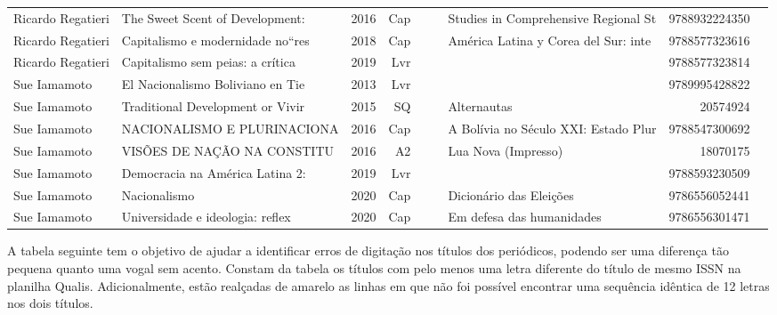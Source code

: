 \documentclass[12pt,brazil]{article}\usepackage[]{graphicx}\usepackage[]{xcolor}
\newcounter{tabela}
\begin{document}
\begin{longtable}{lllrrllrr}
Ricardo Regatieri & The Sweet Scent of Development:  & 2016 & Cap &  &  & Studies in Comprehensive Regional St & 9788932224350 \\
Ricardo Regatieri & Capitalismo e modernidade no“res & 2018 & Cap &  &  & América Latina y Corea del Sur: inte & 9788577323616 \\
Ricardo Regatieri & Capitalismo sem peias: a crítica & 2019 & Lvr &  &  &  & 9788577323814 \\
Sue Iamamoto & El Nacionalismo Boliviano en Tie & 2013 & Lvr &  &  &  & 9789995428822 \\
Sue Iamamoto & Traditional Development or Vivir & 2015 & SQ &  &  & Alternautas & 20574924 \\
Sue Iamamoto & NACIONALISMO E PLURINACIONA & 2016 & Cap &  &  & A Bolívia no Século XXI: Estado Plur & 9788547300692 \\
Sue Iamamoto & VISÕES DE NAÇÃO NA CONSTITU & 2016 & A2 &  &  & Lua Nova (Impresso) & 18070175 \\
Sue Iamamoto & Democracia na América Latina 2:  & 2019 & Lvr &  &  &  & 9788593230509 \\
Sue Iamamoto & Nacionalismo & 2020 & Cap &  &  & Dicionário das Eleições & 9786556052441 \\
\rowcolor{coautr}Sue Iamamoto & Universidade e ideologia: reflex & 2020 & Cap &  &  & Em defesa das humanidades & 9786556301471 \\
\end{longtable}

\normalsize

\clearpage

A tabela seguinte tem o objetivo de ajudar a identificar erros de
digitação nos títulos dos periódicos, podendo ser uma diferença tão pequena
quanto uma vogal sem acento. Constam da tabela os títulos com pelo menos uma
letra diferente do título de mesmo ISSN na planilha Qualis. Adicionalmente,
estão realçadas de amarelo as linhas em que não foi possível encontrar uma
sequência idêntica de 12 letras nos dois títulos.
\end{document}
